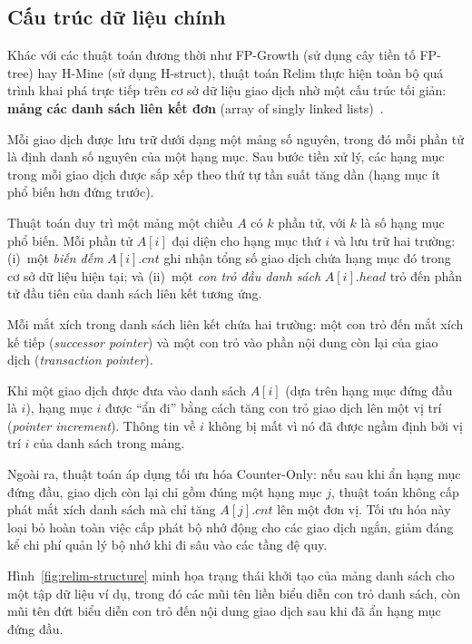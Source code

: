 \documentclass[12pt,a4paper]{report}
\begin{document}
\subsection{Cấu trúc dữ liệu chính}
\label{subsec:ds}
 
Khác với các thuật toán đương thời như FP-Growth (sử dụng cây tiền tố FP-tree) hay
H-Mine (sử dụng H-struct), thuật toán Relim thực hiện toàn bộ quá trình khai phá
trực tiếp trên cơ sở dữ liệu giao dịch nhờ một cấu trúc tối giản:
\textbf{mảng các danh sách liên kết đơn} (array of singly linked lists)~\cite{borgelt2005}.
 
Mỗi giao dịch được lưu trữ dưới dạng một mảng số nguyên, trong đó mỗi phần tử là
định danh số nguyên của một hạng mục. Sau bước tiền xử lý, các hạng mục trong mỗi
giao dịch được sắp xếp theo thứ tự tần suất tăng dần (hạng mục ít phổ biến hơn đứng
trước).
 
Thuật toán duy trì một mảng một chiều $A$ có $k$ phần tử, với $k$ là số hạng mục
phổ biến. Mỗi phần tử $A[i]$ đại diện cho hạng mục thứ $i$ và lưu trữ hai trường:
(i)~một \textit{biến đếm} $A[i].\mathit{cnt}$ ghi nhận tổng số giao dịch chứa hạng
mục đó trong cơ sở dữ liệu hiện tại; và (ii)~một \textit{con trỏ đầu danh sách}
$A[i].\mathit{head}$ trỏ đến phần tử đầu tiên của danh sách liên kết tương ứng.
 
Mỗi mắt xích trong danh sách liên kết chứa hai trường: một con trỏ đến mắt xích kế
tiếp (\textit{successor pointer}) và một con trỏ vào phần nội dung còn lại của giao
dịch (\textit{transaction pointer}).
 
Khi một giao dịch được đưa vào danh sách $A[i]$ (dựa trên hạng mục đứng đầu là $i$),
hạng mục $i$ được ``ẩn đi'' bằng cách tăng con trỏ giao dịch lên một vị trí
(\textit{pointer increment}). Thông tin về $i$ không bị mất vì nó đã được ngầm định
bởi vị trí $i$ của danh sách trong mảng.
 
Ngoài ra, thuật toán áp dụng tối ưu hóa Counter-Only: nếu sau khi ẩn hạng mục
đứng đầu, giao dịch còn lại chỉ gồm đúng một hạng mục $j$, thuật toán không cấp
phát mắt xích danh sách mà chỉ tăng $A[j].\mathit{cnt}$ lên một đơn vị. Tối ưu
hóa này loại bỏ hoàn toàn việc cấp phát bộ nhớ động cho các giao dịch ngắn, giảm
đáng kể chi phí quản lý bộ nhớ khi đi sâu vào các tầng đệ quy.
 
Hình~\ref{fig:relim-structure} minh họa trạng thái khởi tạo của mảng danh sách cho
một tập dữ liệu ví dụ, trong đó các mũi tên liền biểu diễn con trỏ danh sách, còn
mũi tên đứt biểu diễn con trỏ đến nội dung giao dịch sau khi đã ẩn hạng mục đứng đầu.
 
\end{document}
